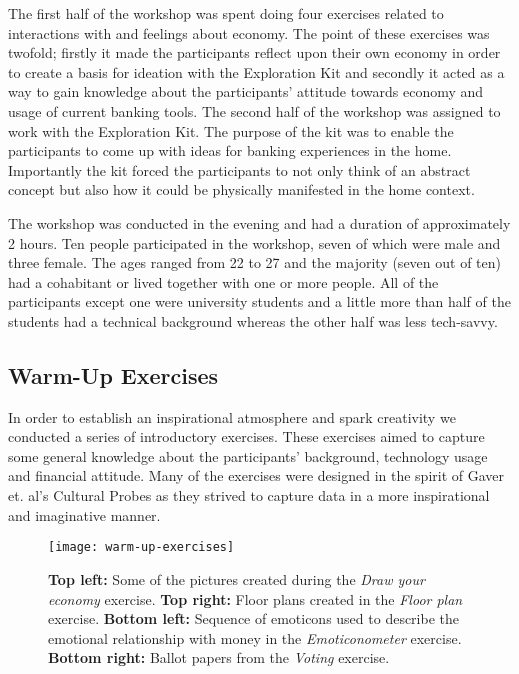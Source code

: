 The first half of the workshop was spent doing four exercises related to interactions with and feelings about economy. The point of these exercises was twofold; firstly it made the participants reflect upon their own economy in order to create a basis for ideation with the Exploration Kit and secondly it acted as a way to gain knowledge about the participants’ attitude towards economy and usage of current banking tools. The second half of the workshop was assigned to work with the Exploration Kit. The purpose of the kit was to enable the participants to come up with ideas for banking experiences in the home. Importantly the kit forced the participants to not only think of an abstract concept but also how it could be physically manifested in the home context.

The workshop was conducted in the evening and had a duration of approximately 2 hours. Ten people participated in the workshop, seven of which were male and three female. The ages ranged from 22 to 27 and the majority (seven out of ten) had a cohabitant or lived together with one or more people. All of the participants except one were university students and a little more than half of the students had a technical background whereas the other half was less tech-savvy.

\subsection{Warm-Up Exercises}
In order to establish an inspirational atmosphere and spark creativity we conducted a series of introductory exercises. These exercises aimed to capture some general knowledge about the participants’ background, technology usage and financial attitude. Many of the exercises were designed in the spirit of Gaver et. al’s Cultural Probes \cite{gaver1999design} as they strived to capture data in a more inspirational and imaginative manner.

\begin{figure}[!h]
	\centering
	\texttt{[image: warm-up-exercises]}
	\caption{\textbf{Top left:} Some of the pictures created during the \textit{Draw your economy} exercise. \textbf{Top right:} Floor plans created in the \textit{Floor plan} exercise. \textbf{Bottom left:} Sequence of emoticons used to describe the emotional relationship with money in the \textit{Emoticonometer} exercise. \textbf{Bottom right:} Ballot papers from the \textit{Voting} exercise.}
	\label{fig:warm-up-exercises}
\end{figure}
